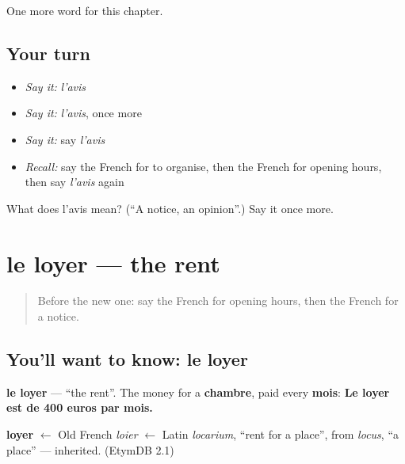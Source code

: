 \begin{grammarlens}[title={What you've built}]
One more word for this chapter.
\end{grammarlens}

\subsection*{Your turn}
\begin{itemize}
\raggedright
  \item \emph{Say it:} \emph{l'avis}
  \item \emph{Say it:} \emph{l'avis}, once more
  \item \emph{Say it:} say \emph{l'avis}
  \item \emph{Recall:} say the French for to organise, then the French for opening hours, then say \emph{l'avis} again
\end{itemize}

\begin{tcolorbox}[breakable,colback=teal!4,colframe=teal!35!black,title={Before you move on}]
What does l'avis mean? (\textquotedblleft{}A notice, an opinion\textquotedblright{}.) Say it once more.
\end{tcolorbox}
\section[le loyer]{le loyer — the rent}

\label{lesson:FR-C142-le-loyer}



\begin{quote}
Before the new one: say the French for opening hours, then the French for a notice.
\end{quote}

\subsection*{You'll want to know: le loyer}
\textbf{le loyer} — \textquotedblleft{}the rent\textquotedblright{}. The money for a \textbf{chambre}, paid every \textbf{mois}: \textbf{Le loyer est de 400 euros par mois.}

\begin{cousinweb}
\textbf{loyer} $\leftarrow$ Old French \emph{loier} $\leftarrow$ Latin \emph{locarium}, \textquotedblleft{}rent for a place\textquotedblright{}, from \emph{locus}, \textquotedblleft{}a place\textquotedblright{} — inherited. (EtymDB 2.1)
\end{cousinweb}

